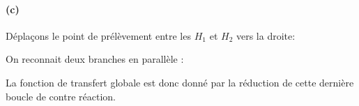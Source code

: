 \paragraph{(c)}
\begin{center}
    
\end{center}
Déplaçons le point de prélèvement entre les $H_1$ et $H_2$ vers la droite:
\begin{center}
    
\end{center}
On reconnait deux branches en parallèle :
\begin{center}
    
\end{center}
La fonction de transfert globale est donc donné par la réduction de cette 
dernière boucle de contre réaction.
\begin{center}
    
\end{center}

